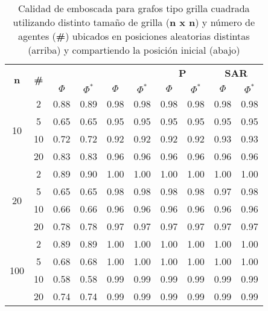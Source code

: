 \begin{table}
	\caption{Calidad de emboscada para grafos tipo grilla cuadrada
	utilizando distinto tamaño de grilla (\textbf{n x n}) y n\'umero de agentes
	(\textbf{\#}) ubicados en posiciones aleatorias distintas (arriba) y
	compartiendo la posici\'on inicial (abajo)}
	\label{tab:ambush_grid}
	\centering
	\begin{small}
		\setlength{\tabcolsep}{4pt}
		\begin{tabular}{|c|c|cc|cc|cc|cc|}
			\hline
			\multirow{2}{*}{\textbf{n}} &
			\multirow{2}{*}{\textbf{\#}} &
			\multicolumn{2}{c|}{\textbf{\astar}} &
			\multicolumn{2}{c|}{\textbf{\ambush}} &
			\multicolumn{2}{c|}{\textbf{P}} &
			\multicolumn{2}{c|}{\textbf{SAR}}\\
			& & $\Phi$ & $\Phi^*$ & $\Phi$ & $\Phi^*$&
			$\Phi$ & $\Phi^*$& $\Phi$ & $\Phi^*$\\
			\hline
			\multirow{4}{*}{10}
			 & 2 & 0.88 & 0.89 & 0.98 & 0.98 & 0.98 & 0.98 & 0.98 & 0.98\\
			 & 5 & 0.65 & 0.65 & 0.95 & 0.95 & 0.95 & 0.95 & 0.95 & 0.95\\
			 & 10 & 0.72 & 0.72 & 0.92 & 0.92 & 0.92 & 0.92 & 0.93 & 0.93\\
			 & 20 & 0.83 & 0.83 & 0.96 & 0.96 & 0.96 & 0.96 & 0.96 & 0.96\\
			\hline
			\multirow{4}{*}{20}
			 & 2 & 0.89 & 0.90 & 1.00 & 1.00 & 1.00 & 1.00 & 1.00 & 1.00\\
			 & 5 & 0.65 & 0.65 & 0.98 & 0.98 & 0.98 & 0.98 & 0.97 & 0.98\\
			 & 10 & 0.66 & 0.66 & 0.96 & 0.96 & 0.96 & 0.96 & 0.96 & 0.96\\
			 & 20 & 0.78 & 0.78 & 0.97 & 0.97 & 0.97 & 0.97 & 0.97 & 0.97\\
			 \hline
			\multirow{4}{*}{100}
			 & 2 & 0.89 & 0.89 & 1.00 & 1.00 & 1.00 & 1.00 & 1.00 & 1.00\\
			 & 5 & 0.68 & 0.68 & 1.00 & 1.00 & 1.00 & 1.00 & 1.00 & 1.00\\
			 & 10 & 0.58 & 0.58 & 0.99 & 0.99 & 0.99 & 0.99 & 0.99 & 0.99\\
			 & 20 & 0.74 & 0.74 & 0.99 & 0.99 & 0.99 & 0.99 & 0.99 & 0.99\\
			 \hline
		\end{tabular}
		

\end{small}
\end{table}
